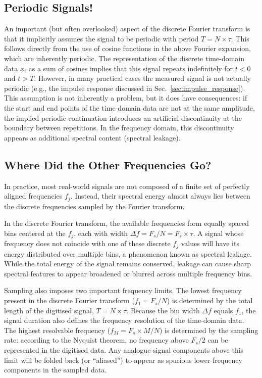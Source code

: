 \documentclass[12pt,a4paper]{article}
\providecommand{\seclabel}[1]{\label{sec:#1}}
\providecommand{\secn}[1]{Sec.~\ref{sec:#1}}
\begin{document}
\subsection{Periodic Signals!}\seclabel{Fourier_periodic}
An important (but often overlooked) aspect of the discrete Fourier transform is that it implicitly assumes the signal to be periodic with period $T = N \times \tau$.  
This follows directly from the use of cosine functions in the above Fourier expansion, which are inherently periodic. The representation of the discrete time-domain data $x_i$ as a sum of cosines implies that this signal repeats indefinitely for $t < 0$ and $t > T$.  
However, in many practical cases the measured signal is not actually periodic (e.g., the impulse response discussed in \secn{impulse_response}). This assumption is not inherently a problem, but it does have consequences: if the start and end points of the time-domain data are not at the same amplitude, the implied periodic continuation introduces an artificial discontinuity at the boundary between repetitions. In the frequency domain, this discontinuity appears as additional spectral content (spectral leakage).

\subsection{Where Did the Other Frequencies Go?}
In practice, most real-world signals are not composed of a finite set of perfectly aligned frequencies $f_j$.  
Instead, their spectral energy almost always lies between the discrete frequencies sampled by the Fourier transform.

In the discrete Fourier transform, the available frequencies form equally spaced bins centered at the $f_j$, each with width $\Delta f = F_s/N = F_s \times \tau$.
A signal whose frequency does not coincide with one of these discrete $f_j$ values will have its energy distributed over multiple bins, a phenomenon known as spectral leakage. While the total energy of the signal remains conserved, leakage can cause sharp spectral features to appear broadened or blurred across multiple frequency bins.

Sampling also imposes two important frequency limits.  
The lowest frequency present in the discrete Fourier transform ($f_1 = F_s/N$) is determined by the total length of the digitised signal, $T = N \times \tau$.  
Because the bin width $\Delta f$ equals $f_1$, the signal duration also defines the frequency resolution of the time-domain data.  
The highest resolvable frequency ($f_M = F_s \times M / N$) is determined by the sampling rate: according to the Nyquist theorem, no frequency above $F_s/2$ can be represented in the digitised data.  
Any analogue signal components above this limit will be folded back (or ``aliased'') to appear as spurious lower-frequency components in the sampled data.
\end{document}
